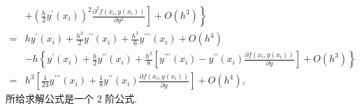 \begin{tcolorbox}[enhanced,colback=8,colframe=7,breakable,coltitle=green!25!black,title=2024]
$$\begin{aligned}
& \left.\left.+\left(\frac{h}{2} y^{\prime}\left(x_{i}\right)\right)^{2} \frac{\partial^{2} f\left(x_{i}, y\left(x_{i}\right)\right)}{\partial y^{2}}\right]+O\left(h^{3}\right)\right\} \\
= & h y^{\prime}\left(x_{i}\right)+\frac{h^{2}}{2} y^{\prime \prime}\left(x_{i}\right)+\frac{h^{3}}{6} y^{\prime \prime \prime}\left(x_{i}\right)+O\left(h^{4}\right) \\
& -h\left\{y^{\prime}\left(x_{i}\right)+\frac{h}{2} y^{\prime \prime}\left(x_{i}\right)+\frac{h^{2}}{8}\left[y^{\prime \prime \prime}\left(x_{i}\right)-y^{\prime \prime}\left(x_{i}\right) \frac{\partial f\left(x_{i}, y\left(x_{i}\right)\right)}{\partial y}\right]+O\left(h^{3}\right)\right\} \\
= & h^{3}\left[\frac{1}{24} y^{\prime \prime \prime}\left(x_{i}\right)+\frac{1}{8} y^{\prime \prime}\left(x_{i}\right) \frac{\partial f\left(x_{i}, y\left(x_{i}\right)\right)}{\partial y}\right]+O\left(h^{4}\right),
\end{aligned}
$$
所给求解公式是一个 2 阶公式.
 \end{tcolorbox}


